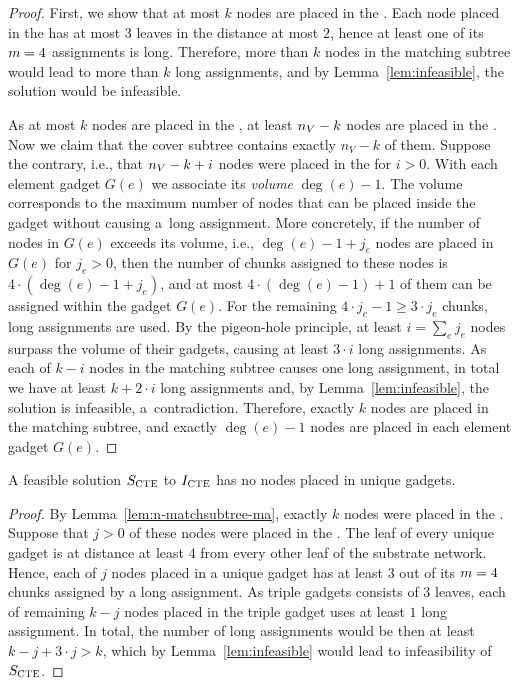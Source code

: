 \begin{proof}
  First, we show that at most $k$ nodes are placed in the \MatchSubtree.
  Each node placed in the \MatchSubtree{} has at most $3$ leaves in the distance at most $2$, hence at least one of its $m=4$ assignments is long.
  Therefore, more than $k$ nodes in the matching subtree would lead to more than $k$ long assignments, and by Lemma~\ref{lem:infeasible}, the solution would be infeasible.
  
  As at most $k$ nodes are placed in the \MatchSubtree{}, at least $n_V-k$ nodes are placed in the \CoverSubtree.
  Now we claim that the cover subtree contains exactly $n_V-k$ of them.
  Suppose the contrary, i.e., that $n_V-k+i$ nodes were placed in the \CoverSubtree{} for $i > 0$.
  With each element gadget $G(e)$ we associate its \emph{volume} $\deg(e) - 1$.
  The volume corresponds to the maximum number of nodes that can be placed inside the gadget without causing a~long assignment.
  More concretely, if the number of nodes in $G(e)$ exceeds its volume, i.e., $\deg(e) - 1 + j_e$ nodes are placed in $G(e)$ for $j_e > 0$,
  then the number of chunks assigned to these nodes is $4\cdot (\deg(e) - 1 + j_e)$, and at most $4\cdot (\deg(e) - 1) + 1$ of them can be assigned within the gadget $G(e)$.
  For the remaining $4\cdot j_e - 1 \geq 3\cdot j_e$ chunks, long assignments are used.
  By the pigeon-hole principle, at least $i = \sum_e j_e$ nodes surpass the volume of their gadgets, causing at least $3\cdot i$ long assignments.
  As each of $k-i$ nodes in the matching subtree causes one long assignment, in total we have at least $k+2\cdot i$ long assignments and, by Lemma~\ref{lem:infeasible}, the solution is infeasible, a~contradiction.
  Therefore, exactly $k$ nodes are placed in the matching subtree, and exactly $\deg(e) - 1$ nodes are placed in each element gadget $G(e)$.
\end{proof}

\begin{lemma}
  A feasible solution $S_{\mathrm{\textsc{CTE}}}$ to $I_{\mathrm{\textsc{CTE}}}$ has no nodes placed in unique gadgets.
  \label{lem:no-unq-ma}
\end{lemma}
\begin{proof}
  By Lemma~\ref{lem:n-matchsubtree-ma}, exactly $k$ nodes were placed in the \MatchSubtree{}.
  Suppose that $j>0$ of these nodes were placed in the \UnqGadgets{}.
  The leaf of every unique gadget is at distance at least $4$ from every other leaf of the substrate network.
  Hence, each of $j$ nodes placed in a unique gadget has at least $3$ out of its $m = 4$ chunks assigned by a long assignment.
  As triple gadgets consists of $3$ leaves, each of remaining $k-j$ nodes placed in the triple gadget uses at least $1$ long assignment.
  In total, the number of long assignments would be then at least $k-j + 3\cdot j > k$, which by Lemma~\ref{lem:infeasible} would lead to infeasibility of $S_{\mathrm{\textsc{CTE}}}$.
\end{proof}

